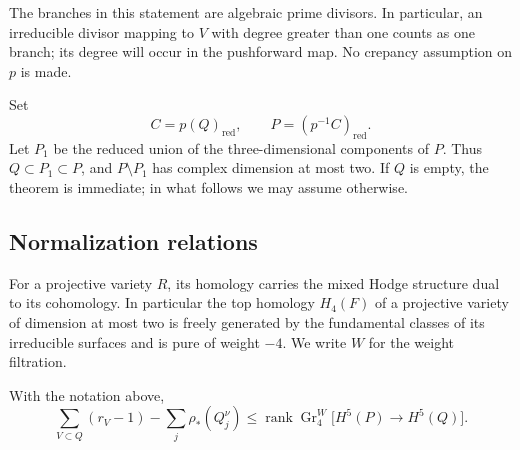 The branches in this statement are algebraic prime divisors.
In particular, an irreducible divisor mapping to $V$ with degree
greater than one counts as one branch; its degree will occur in the
pushforward map.  No crepancy assumption on $p$ is made.

Set
\begin{equation}\label{eq:branch-loci}
 C=p(Q)_{\mathrm{red}},\qquad
 P=(p^{-1}C)_{\mathrm{red}}.
\end{equation}
Let $P_1$ be the reduced union of the three-dimensional components
of $P$.  Thus $Q\subset P_1\subset P$, and $P\setminus P_1$ has complex
dimension at most two.  If $Q$ is empty, the theorem is immediate; in
what follows we may assume otherwise.

\subsection{Normalization relations}

For a projective variety $R$, its homology carries the mixed Hodge
structure dual to its cohomology.  In particular the top homology
$H_4(F)$ of a projective variety of dimension at most two is freely
generated by the fundamental classes of its irreducible surfaces and
is pure of weight $-4$.  We write $W$ for the weight filtration.

\begin{lemma}\label{lem:conductor}
With the notation above,
\begin{equation}\label{eq:conductor-rank}
 \sum_{V\subset Q}(r_V-1)-\sum_j\rho_*(Q_j^\nu)
 \leq
 \operatorname{rank}\operatorname{Gr}^{W}_{4}
       \bigl[H^5(P)\longrightarrow H^5(Q)\bigr].
\end{equation}
\end{lemma}

